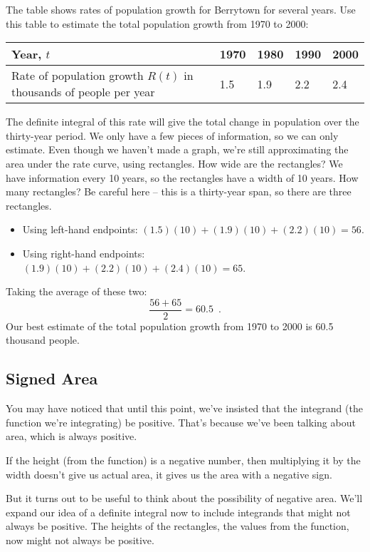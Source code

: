\begin{example}
The table shows rates of population growth for Berrytown for several years. Use this table to estimate the total population growth from 1970 to 2000:
\begin{tabular}{lllll}
  \toprule
Year, $t$ &	1970 &	1980 &	1990 &	2000 \\
\midrule
Rate of population growth $R(t)$ in thousands of people per year &	1.5 &	1.9 &	2.2 &	2.4\\
\bottomrule
\end{tabular}

\begin{solution}
The definite integral of this rate will give the total change in population over the thirty-year period. We only have a few pieces of information, so we can only estimate. Even though we haven't made a graph, we're still approximating the area under the rate curve, using rectangles. How wide are the rectangles? We have information every 10 years, so the rectangles have a width of 10 years. How many rectangles? Be careful here – this is a thirty-year span, so there are three rectangles.
  \begin{itemize}
    \item Using left-hand endpoints: $(1.5)(10) + (1.9)(10) + (2.2)(10) = 56$.
    \item Using right-hand endpoints: $(1.9)(10) + (2.2)(10) + (2.4)(10) = 65$.
  \end{itemize}
Taking the average of these two:
$$\dfrac{56+65}{2} = 60.5 \enspace .$$
Our best estimate of the total population growth from 1970 to 2000 is 60.5 thousand people.
\end{solution}\end{example}

\subsection{Signed Area}
You may have noticed that until this point, we've insisted that the integrand (the function we're integrating) be positive. That’s because we've been talking about area, which is always positive.

If the height (from the function) is a negative number, then multiplying it by the width doesn't give us actual area, it gives us the area with a negative sign.

But it turns out to be useful to think about the possibility of negative area. We’ll expand our idea of a definite integral now to include integrands that might not always be positive. The heights of the rectangles, the values from the function, now might not always be positive.

